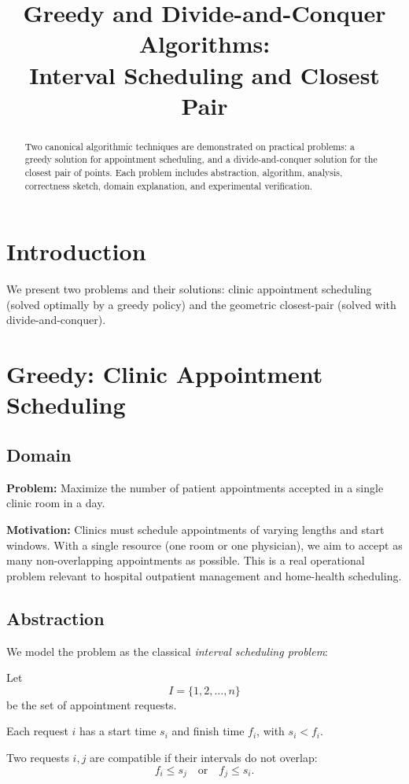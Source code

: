 \documentclass[conference]{IEEEtran}
\title{Greedy and Divide-and-Conquer Algorithms: \\ Interval Scheduling and Closest Pair}
\author{\IEEEauthorblockN{Your Name(s)}
\IEEEauthorblockA{Department \\ University \\ email@university.edu}}
\begin{document}
\maketitle
\begin{abstract}
Two canonical algorithmic techniques are demonstrated on practical problems: a greedy solution for appointment scheduling, and a divide-and-conquer solution for the closest pair of points. Each problem includes abstraction, algorithm, analysis, correctness sketch, domain explanation, and experimental verification.
\end{abstract}

\section{Introduction}
We present two problems and their solutions: clinic appointment scheduling (solved optimally by a greedy policy) and the geometric closest-pair (solved with divide-and-conquer).

\section{Greedy: Clinic Appointment Scheduling}

\subsection{Domain}
\textbf{Problem:} Maximize the number of patient appointments accepted in a single clinic room in a day.  

\textbf{Motivation:} Clinics must schedule appointments of varying lengths and start windows. With a single resource (one room or one physician), we aim to accept as many non-overlapping appointments as possible. This is a real operational problem relevant to hospital outpatient management and home-health scheduling.  

\subsection{Abstraction}
We model the problem as the classical \emph{interval scheduling problem}:  

Let 
\[
I = \{1,2,\dots,n\}
\]
be the set of appointment requests.  

Each request $i$ has a start time $s_i$ and finish time $f_i$, with $s_i < f_i$.  

Two requests $i,j$ are compatible if their intervals do not overlap:
\[
f_i \le s_j \quad \text{or} \quad f_j \le s_i.
\]
\end{document}
